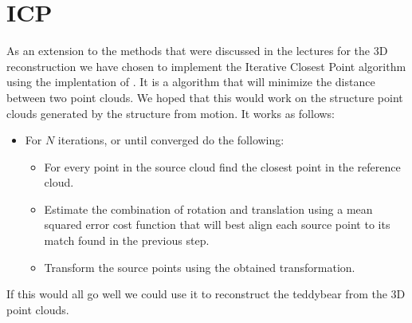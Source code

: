\section{ICP}
\label{ICP}
As an extension to the methods that were discussed in the lectures for the 3D reconstruction we have chosen to implement the Iterative Closest Point algorithm using the implentation of . It is a algorithm that will minimize the distance between two point clouds. We hoped that this would work on the structure point clouds generated by the structure from motion. It works as follows:

\begin{itemize}
	\item For $N$ iterations, or until converged do the following:
	\begin{itemize}
		\item For every point in the source cloud find the closest point in the reference cloud.
		\item Estimate the combination of rotation and translation using a mean squared error cost function that will best align each source point to its match found in the previous step.
		\item Transform the source points using the obtained transformation.
	\end{itemize}
\end{itemize}

If this would all go well we could use it to reconstruct the teddybear from the 3D point clouds.
